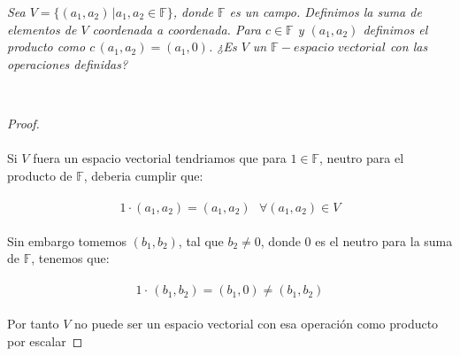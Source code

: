 \documentclass[11pt,letterpaper]{article}
\begin{document}
\begin{tcolorbox}[
	title = \textcolor{black}{\textcolor{white}{Problema 8}},]
\textit{Sea $V=\{(a_1,a_2)\,|a_1,a_2\in \mathbb{F}\}$, donde $\mathbb{F}$ es un campo. Definimos la suma de elementos de $V$ 
coordenada a coordenada. Para $c\in \mathbb{F}$ y $(a_1,a_2)$ definimos el producto como $c\,(a_1,a_2)=(a_1,0)$. ¿Es $V$
un $\mathbb{F}-espacio\,\,vectorial$ con las operaciones definidas?}
\end{tcolorbox}\,\\
\begin{proof}\,\\
	\,\\
	Si $V$ fuera un espacio vectorial tendriamos que para $1\in \mathbb{F}$, neutro para el producto de $\mathbb{F}$, deberia cumplir que:\,\\
	\,\\
	\begin{equation*}
		1\cdot(a_1,a_2)=(a_1,a_2)\,\,\,\,\forall (a_1,a_2)\in V
	\end{equation*}\,\\
	Sin embargo tomemos $(b_1,b_2)$, tal que $b_2\neq 0$, donde $0$ es el neutro para la suma de $\mathbb{F}$, tenemos que:\,\\
	\,\\
	\begin{equation*}
		1\cdot\,(b_1,b_2)=(b_1,0)\neq (b_1,b_2)
	\end{equation*}\,\\
	Por tanto $V$ no puede ser un espacio vectorial con esa operaci\'on como producto por escalar
    
\end{proof}\,\\
\end{document}
